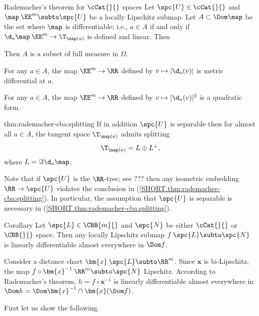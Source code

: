 \begin{thm}{Rademacher's theorem for $\cCat{}{}$ spaces}\label{thm:rademacher-cba}
Let $\spc{U}\in\cCat{}{}$  
and $\map\:\EE^m\subto\spc{U}$ be a locally Lipschitz submap.
Let $A\subset \Dom \map$ be the set where $\map$ is differentiable;
i.e., $a\in A$ if and only if $\d_a\map\:\EE^m\to\T_{\map(a)}$ is defined and linear.
Then 
\begin{subthm}{}
Then $A$ is a subset of full measure in $\Omega$.
\end{subthm}

\begin{subthm}{}
For any $a\in A$,
the map $\EE^m\to\RR$ defined by $v\mapsto |\d_a(v)|$ is metric differential at $a$.
\end{subthm}

\begin{subthm}{}
For any $a\in A$,
the map $\EE^m\to\RR$ defined by $v\mapsto |\d_a(v)|^2$ is a quadratic form.
\end{subthm}

\begin{subthm}{thm:rademacher-cba:splitting}
If in addition $\spc{U}$ is separable then for almost all $a\in A$, 
the tangent space
$\T_{\map(a)}$ admits splitting
\[\T_{\map(a)}=L\oplus L^\bot,\]
where $L=\Im\d_a\map$.
\end{subthm}
\end{thm}

Note that if $\spc{U}$ is the $\RR$-tree;
see ??? then any isometric embedding $\RR\to \spc{U}$ violates the conclusion in (\ref{SHORT.thm:rademacher-cba:splitting}).
In particular, the assumption that $\spc{U}$ is separable is necessary in (\ref{SHORT.thm:rademacher-cba:splitting}).


\begin{thm}{Corollary}\label{cor:rademacher-cbb-sourse}
Let $\spc{L}\in\CBB{m}{}$ and $\spc{N}$ be either $\cCat{}{}$ or $\CBB{}{}$ space.
Then any locally Lipschitz submap $f\:\spc{L}\subto\spc{N}$ is linearly differentiable almost everywhere in $\Dom f$. 
\end{thm}

Consider a distance chart $\bm{x}\:\spc{L}\subto \RR^m$.
Since $\bm{x}$ is bi-Lipschitz,
the map $f\circ\bm{x}^{-1}\:\RR^m\subto\spc{N}$ Lipschitz.
According to Rademacher's theorem,
$h=f\circ\bm{x}^{-1}$ is linearly differentiable almost everywhere
in $\Dom h=\Dom\bm{x}^{-1}\cap \bm{x}(\Dom f)$.

First let us show the following.


